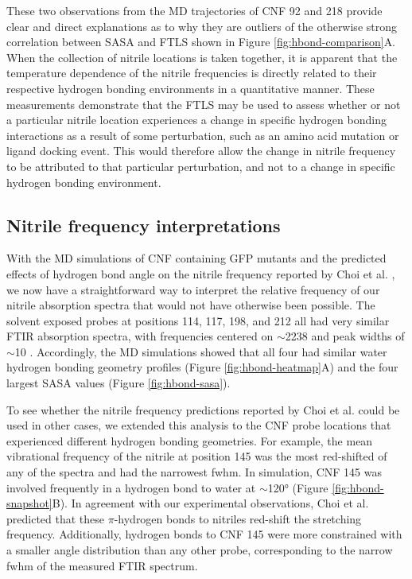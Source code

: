 These two observations from the MD trajectories of CNF 92 and 218 provide clear and direct explanations as to why they are outliers of the otherwise strong correlation between SASA and FTLS shown in Figure \ref{fig:hbond-comparison}A.
When the collection of nitrile locations is taken together, it is apparent that the temperature dependence of the nitrile frequencies is directly related to their respective hydrogen bonding environments in a quantitative manner.
These measurements demonstrate that the FTLS may be used to assess whether or not a particular nitrile location experiences a change in specific hydrogen bonding interactions as a result of some perturbation, such as an amino acid mutation or ligand docking event.
This would therefore allow the change in nitrile frequency to be attributed to that particular perturbation, and not to a change in specific hydrogen bonding environment.

\subsection{Nitrile frequency interpretations}

With the MD simulations of CNF containing GFP mutants and the predicted effects of hydrogen bond angle on the nitrile frequency reported by Choi et al. \cite{Choi2008}, we now have a straightforward way to interpret the relative frequency of our nitrile absorption spectra that would not have otherwise been possible.
The solvent exposed probes at positions 114, 117, 198, and 212 all had very similar FTIR absorption spectra, with frequencies centered on $\sim$2238 \si{\wn} and peak widths of $\sim$10 \si{\wn}.
Accordingly, the MD simulations showed that all four had similar water hydrogen bonding geometry profiles (Figure \ref{fig:hbond-heatmap}A) and the four largest SASA values (Figure \ref{fig:hbond-sasa}).

To see whether the nitrile frequency predictions reported by Choi et al. could be used in other cases, we extended this analysis to the CNF probe locations that experienced different hydrogen bonding geometries.
For example, the mean vibrational frequency of the nitrile at position 145 was the most red-shifted of any of the spectra and had the narrowest fwhm.
In simulation, CNF 145 was involved frequently in a hydrogen bond to water at $\sim$\ang{120} (Figure \ref{fig:hbond-snapshot}B).
In agreement with our experimental observations, Choi et al. predicted that these $\pi$-hydrogen bonds to nitriles red-shift the stretching frequency.
Additionally, hydrogen bonds to CNF 145 were more constrained with a smaller angle distribution than any other probe, corresponding to the narrow fwhm of the measured FTIR spectrum. 

